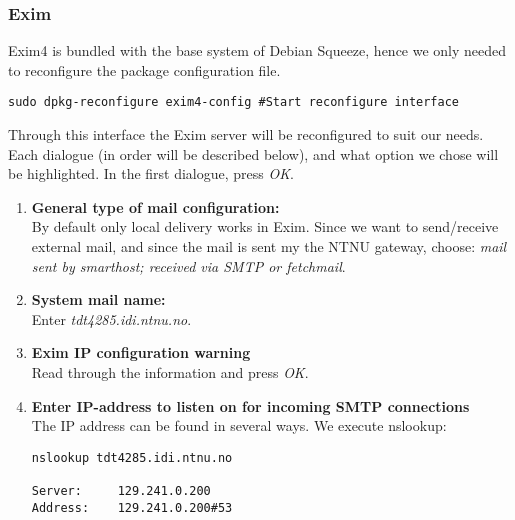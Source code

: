 \subsubsection{Exim}
Exim4 is bundled with the base system of Debian Squeeze, hence we only
needed to reconfigure the package configuration file.
\begin{lstlisting}
sudo dpkg-reconfigure exim4-config #Start reconfigure interface
\end{lstlisting}
Through this interface the Exim server will be reconfigured to suit our
needs. Each dialogue (in order will be described below), and what option
we chose will be highlighted. In the first dialogue, press
\emph{OK}.
\begin{enumerate}
\item\textbf{General type of mail configuration:}\\
By default only local delivery works in Exim. Since we want to
send/receive external mail, and since the mail is sent my the NTNU
gateway, choose: \emph{mail sent by smarthost; received via SMTP or
fetchmail}.
\item\textbf{System mail name:}\\
Enter \emph{tdt4285.idi.ntnu.no}.
\item\textbf{Exim IP configuration warning}\\
Read through the information and press \emph{OK}.
\item\textbf{Enter IP-address to listen on for incoming SMTP
connections}\\
The IP address can be found in several ways. We execute nslookup:
\begin{lstlisting}
nslookup tdt4285.idi.ntnu.no

Server:		129.241.0.200
Address:	129.241.0.200#53


\end{lstlisting}
\end{enumerate}

